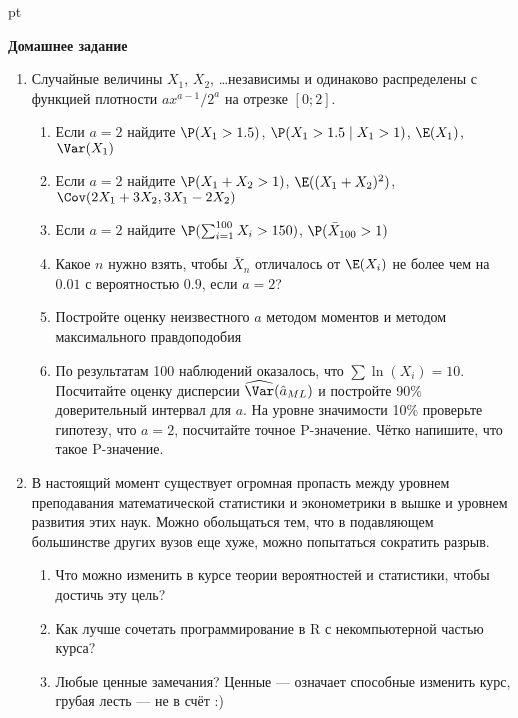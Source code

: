 \documentclass[pdftex,12pt,a4paper]{article}
\begin{document}
 pt %

\textbf{Домашнее задание}

\begin{enumerate}
\item Случайные величины $X_1$, $X_2$, \ldots независимы и одинаково распределены с функцией плотности $a x^{a-1}/2^a$ на отрезке $[0;2]$.
\begin{enumerate}
\item Если $a=2$ найдите $\P(X_1>1.5)$, $\P(X_1>1.5 \mid X_1>1)$, $\E(X_1)$, $\Var(X_1)$
\item Если $a=2$ найдите $\P(X_1+X_2>1)$, $\E((X_1+X_2)^2)$, $\Cov(2X_1+3X_2,3X_1-2X_2)$
\item Если $a=2$ найдите $\P(\sum_{i=1}^{100}X_i>150)$, $\P(\bar{X}_{100}>1)$
\item Какое $n$ нужно взять, чтобы $\bar{X}_n$ отличалось от $\E(X_i)$ не более чем на $0.01$ с вероятностью $0.9$, если $a=2$?
\item Постройте оценку неизвестного $a$ методом моментов и методом максимального правдоподобия
\item По результатам 100 наблюдений оказалось, что $\sum \ln(X_i)=10$. Посчитайте оценку дисперсии $\widehat{\Var}(\hat{a}_{ML})$ и постройте 90\% доверительный интервал для $a$. На уровне значимости 10\% проверьте гипотезу, что $a=2$, посчитайте точное P-значение. Чётко напишите, что такое P-значение.
\end{enumerate}
\item В настоящий момент существует огромная пропасть между уровнем преподавания математической статистики и эконометрики в вышке и уровнем развития этих наук. Можно обольщаться тем, что в подавляющем большинстве других вузов еще хуже, можно попытаться сократить разрыв.
\begin{enumerate}
\item Что можно изменить в курсе теории вероятностей и статистики, чтобы достичь эту цель? 
\item Как лучше сочетать программирование в R с некомпьютерной частью курса?
\item Любые ценные замечания? Ценные --- означает способные изменить курс, грубая лесть --- не в счёт :)
\end{enumerate}

   

\end{enumerate}
\end{document}
